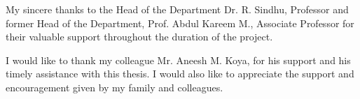 My sincere thanks to the Head of the Department Dr. R. Sindhu, Professor and former Head of the Department, Prof. Abdul 
Kareem M., Associate Professor for their valuable support throughout the duration of the project. 

I would like to thank my colleague Mr. Aneesh M. Koya, for his support and his timely assistance with this thesis. I would also like to appreciate the support and encouragement given by my family and colleagues.


\cleardoublepage


